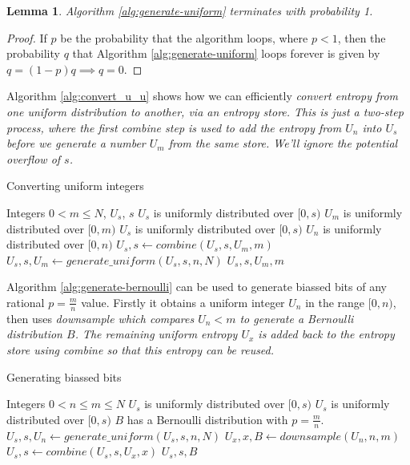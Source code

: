 \documentclass[12pt]{article}
\newtheorem{lemma}{Lemma}
\begin{document}
\begin{lemma}
Algorithm \ref{alg:generate-uniform} terminates with probability 1.
\end{lemma}

\begin{proof}
    If $p$ be the probability that the algorithm loops, where $p<1$, then the probability $q$ that Algorithm \ref{alg:generate-uniform} loops forever is given by $q = (1-p)q \implies q=0$.
\end{proof}


Algorithm \ref{alg:convert_u_u} shows how we can efficiently \em convert \em entropy from one uniform distribution to another, via an entropy store. This is just a two-step process, where the first \em combine \em step is used to add the entropy from $U_n$ into $U_s$ before we generate a number $U_m$ from the same store. We'll ignore the potential overflow of $s$.

\begin{algorithm}
\caption{Converting uniform integers}
\label{alg:convert_u_u}
\begin{algorithmic}[1]
    \Require Integers $0 < m \le N$, $U_s$, $s$
    \Require $U_s$ is uniformly distributed over $[0,s)$
    \Require $U_m$ is uniformly distributed over $[0,m)$
    \Ensure  $U_s$ is uniformly distributed over $[0,s)$
    \Ensure  $U_n$ is uniformly distributed over $[0,n)$
    \State $U_s, s \gets combine(U_s, s, U_m, m)$
    \State $U_s, s, U_m \gets generate\_uniform(U_s, s, n, N)$
    \State \Return $U_s, s, U_m, m$
\EndProcedure
\end{algorithmic}
\end{algorithm}

Algorithm \ref{alg:generate-bernoulli} can be used to generate biassed bits of any rational $p=\frac{m}{n}$ value. Firstly it obtains a uniform integer $U_n$ in the range $[0,n)$, then uses \em downsample \em which compares $U_n<m$ to generate a Bernoulli distribution $B$. The remaining uniform entropy $U_x$ is added back to the entropy store using \em combine \em so that this entropy can be reused.

\begin{algorithm}
\caption{Generating biassed bits}
\label{alg:generate-bernoulli}
\begin{algorithmic}[1]
\Require Integers $0 < n \le m \le N$
\Require $U_s$ is uniformly distributed over $[0,s)$
\Ensure $U_s$ is uniformly distributed over $[0,s)$
\Ensure $B$ has a Bernoulli distribution with $p = \frac{m}{n}$.
    \State $U_s, s, U_n \gets generate\_uniform(U_s, s, n, N)$
    \State $U_x, x, B \gets downsample(U_n, n, m)$
    \State $U_s, s \gets combine(U_s, s, U_x, x)$
    \State \Return $U_s, s, B$
\EndProcedure
\end{algorithmic}
\end{algorithm}
\end{document}
